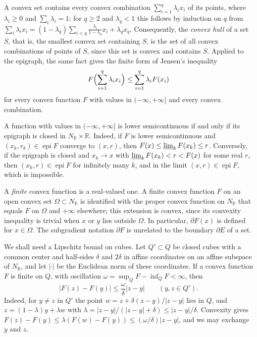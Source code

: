A convex set contains every convex combination $\sum_{i=1}^q\lambda_ix_i$ of its points, where $\lambda_i\geq0$ and $\sum_i\lambda_i=1$: for $q\geq2$ and $\lambda_q<1$ this follows by induction on $q$ from $\sum_i\lambda_ix_i=(1-\lambda_q)\sum_{i<q}\frac{\lambda_i}{1-\lambda_q}x_i+\lambda_qx_q$. Consequently, the \emph{convex hull} of a set $S$, that is, the smallest convex set containing $S$, is the set of all convex combinations of points of $S$, since this set is convex and contains $S$. Applied to the epigraph, the same fact gives the finite form of Jensen's inequality
\[
 F\Bigl(\sum_{i=1}^q\lambda_ix_i\Bigr)\leq\sum_{i=1}^q\lambda_iF(x_i)
\]
for every convex function $F$ with values in $(-\infty,+\infty]$ and every convex combination.

A function with values in $(-\infty,+\infty]$ is lower semicontinuous if and only if its epigraph is closed in $N_{\mathbb R}\times\mathbb R$. Indeed, if $F$ is lower semicontinuous and $(x_k,r_k)\in\operatorname{epi}F$ converge to $(x,r)$, then $F(x)\leq\varliminf_kF(x_k)\leq r$. Conversely, if the epigraph is closed and $x_k\to x$ with $\varliminf_kF(x_k)<r<F(x)$ for some real $r$, then $(x_k,r)\in\operatorname{epi}F$ for infinitely many $k$, and in the limit $(x,r)\in\operatorname{epi}F$, which is impossible.

A \emph{finite} convex function is a real-valued one. A finite convex function $F$ on an open convex set $\Omega\subset N_{\mathbb R}$ is identified with the proper convex function on $N_{\mathbb R}$ that equals $F$ on $\Omega$ and $+\infty$ elsewhere; this extension is convex, since its convexity inequality is trivial when $x$ or $y$ lies outside $\Omega$. In particular, $\partial F(x)$ is defined for $x\in\Omega$. The subgradient notation $\partial F$ is unrelated to the boundary $\partial E$ of a set.

We shall need a Lipschitz bound on cubes. Let $Q'\subset Q$ be closed cubes with a common center and half-sides $\delta$ and $2\delta$ in affine coordinates on an affine subspace of $N_{\mathbb R}$, and let $|\cdot|$ be the Euclidean norm of these coordinates. If a convex function $F$ is finite on $Q$, with oscillation $\omega=\sup_QF-\inf_QF<\infty$, then
\begin{equation}\label{eq:convex-cube-lipschitz}
 |F(z)-F(y)|\leq\frac{\omega}{\delta}|z-y|\qquad(y,z\in Q').
\end{equation}
Indeed, for $y\neq z$ in $Q'$ the point $w=z+\delta(z-y)/|z-y|$ lies in $Q$, and $z=(1-\lambda)y+\lambda w$ with $\lambda=|z-y|/(|z-y|+\delta)\leq|z-y|/\delta$. Convexity gives $F(z)-F(y)\leq\lambda(F(w)-F(y))\leq(\omega/\delta)|z-y|$, and we may exchange $y$ and $z$.

